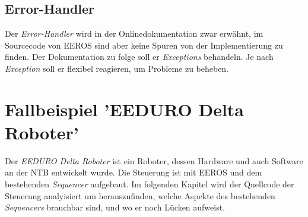 \subsection{Error-Handler}
Der \textit{Error-Handler} wird in der Onlinedokumentation zwar erwähnt, im Sourcecode von EEROS sind aber keine Spuren von der Implementierung zu finden.
Der Dokumentation zu folge soll er \textit{Exceptions} behandeln.
Je nach \textit{Exception} soll er flexibel reagieren, um Probleme zu beheben.



%
%
%
%



\section{Fallbeispiel 'EEDURO Delta Roboter'}


Der \textit{EEDURO Delta Roboter} ist ein Roboter, dessen Hardware und auch Software an der NTB entwickelt wurde.
Die Steuerung ist mit EEROS und dem bestehenden \textit{Sequencer} aufgebaut.
Im folgenden Kapitel wird der Quellcode der Steuerung analyisiert um herauszufinden, welche Aspekte des bestehenden \textit{Sequencers} brauchbar sind, und wo er noch Lücken aufweist.

